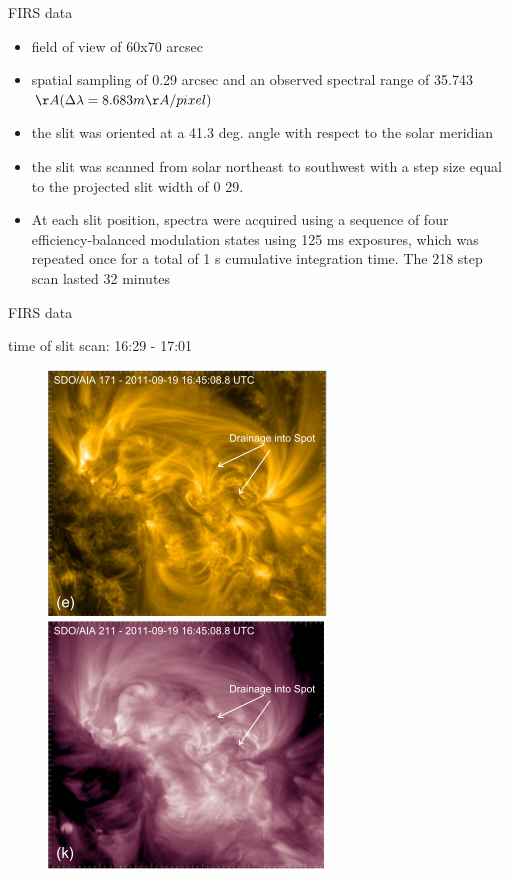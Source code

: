 \documentclass{beamer}
\begin{document}
\begin{frame}{FIRS data}
\begin{itemize}
\item field of view of 60x70 arcsec
\item spatial sampling of 0.29 arcsec and an observed
spectral range of 35.743 $\AA (\Delta \lambda = 8.683 m\AA / pixel )$ 
\item the slit
was oriented at a 41.3 deg. angle with respect to the solar meridian
\item the slit was scanned from solar
northeast to southwest with a step size equal to the projected
slit width of 0 29. 
\item At each slit position, spectra were acquired
using a sequence of four efficiency-balanced modulation states
using 125 ms exposures, which was repeated once for a total of
1 s cumulative integration time. The 218 step scan lasted
32 minutes

\end{itemize}
\end{frame}


\begin{frame}{FIRS data}

time of slit scan: 16:29 - 17:01

\begin{figure}[H]
  \centering
  \begin{minipage}[b]{0.4\textwidth}
    \includegraphics[scale=0.5]{img3.png}
  \end{minipage}
  \hfill
  \begin{minipage}[b]{0.4\textwidth}
    \includegraphics[scale=0.5]{img4.png}
  \end{minipage}
\end{figure}

 



\end{frame}
\end{document}
